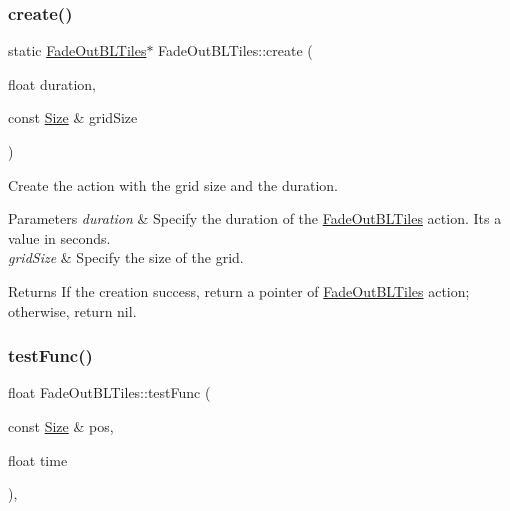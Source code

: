\subsubsection{\texorpdfstring{create()}{create()}\hspace{0.1cm}{\footnotesize\ttfamily [2/2]}}
{\footnotesize\ttfamily static \hyperlink{classFadeOutBLTiles}{Fade\+Out\+B\+L\+Tiles}$\ast$ Fade\+Out\+B\+L\+Tiles\+::create (\begin{DoxyParamCaption}\item[{float}]{duration,  }\item[{const \hyperlink{classSize}{Size} \&}]{grid\+Size }\end{DoxyParamCaption})\hspace{0.3cm}{\ttfamily [static]}}



Create the action with the grid size and the duration. 


\begin{DoxyParams}{Parameters}
{\em duration} & Specify the duration of the \hyperlink{classFadeOutBLTiles}{Fade\+Out\+B\+L\+Tiles} action. It\textquotesingle{}s a value in seconds. \\
\hline
{\em grid\+Size} & Specify the size of the grid. \\
\hline
\end{DoxyParams}
\begin{DoxyReturn}{Returns}
If the creation success, return a pointer of \hyperlink{classFadeOutBLTiles}{Fade\+Out\+B\+L\+Tiles} action; otherwise, return nil. 
\end{DoxyReturn}
\mbox{\label{classFadeOutBLTiles_a00586757931bcc6166dc5052b0ef2633}} 
\subsubsection{\texorpdfstring{test\+Func()}{testFunc()}\hspace{0.1cm}{\footnotesize\ttfamily [1/2]}}
{\footnotesize\ttfamily float Fade\+Out\+B\+L\+Tiles\+::test\+Func (\begin{DoxyParamCaption}\item[{const \hyperlink{classSize}{Size} \&}]{pos,  }\item[{float}]{time }\end{DoxyParamCaption})\hspace{0.3cm}{\ttfamily [override]}, {\ttfamily [virtual]}}




